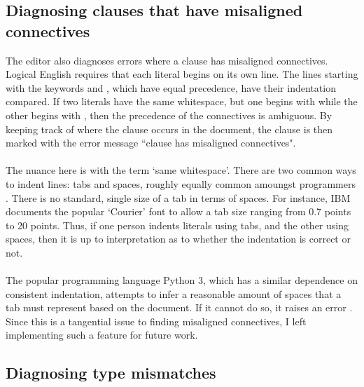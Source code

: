 \documentclass[../main.tex]{subfiles}
\begin{document}
\subsection{Diagnosing clauses that have misaligned connectives}
The editor also diagnoses errors where a clause has misaligned connectives. Logical English requires that each literal begins on its own line. The lines starting with the keywords  and , which have equal precedence, have their indentation compared. If two literals have the same whitespace, but one begins with  while the other begins with , then the precedence of the connectives is ambiguous. By keeping track of where the clause occurs in the document, the clause is then marked with the error message ``clause has misaligned connectives".
\\
\\
The nuance here is with the term `same whitespace'. There are two common ways to indent lines: tabs and spaces, roughly equally common amoungst programmers \cite{tabs_vs_spaces}. There is no standard, single size of a tab in terms of spaces. For instance, IBM documents the popular `Courier' font to allow a tab size ranging from 0.7 points to 20 points. Thus, if one person indents literals using tabs, and the other using spaces, then it is up to interpretation as to whether the indentation is correct or not.
\\
\\
The popular programming language Python 3, which has a similar dependence on consistent indentation, attempts to infer a reasonable amount of spaces that a tab must represent based on the document. If it cannot do so, it raises an error \cite{python_tabs_spaces}. Since this is a tangential issue to finding misaligned connectives, I left implementing such a feature for future work.

\subsection{Diagnosing type mismatches}
\end{document}
